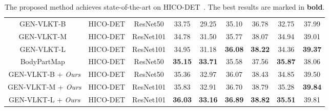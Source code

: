 \documentclass[10pt,twocolumn,letterpaper]{article}
\begin{document}
\begin{table*}
\begin{adjustbox}{width=0.8\linewidth}
\begin{tabular}{c | c c | c c c | c c c}
    GEN-VLKT-B~\cite{liao2022gen} & HICO-DET & ResNet50 & 33.75 & 29.25 & 35.10 & 36.78 & 32.75 & 37.99 \\
    GEN-VLKT-M~\cite{liao2022gen} & HICO-DET & ResNet101 & 34.78 & 31.50 & 35.77 & 38.07 & 34.94 & 39.01 \\
    GEN-VLKT-L~\cite{liao2022gen} & HICO-DET & ResNet101 & 34.95 & 31.18 & \textbf{36.08} & \textbf{38.22} & 34.36 & \textbf{39.37} \\
    BodyPartMap~\cite{wu2022bodypartmap} & HICO-DET & ResNet50 & \textbf{35.15} & \textbf{33.71} & 35.58 & 37.56 & \textbf{35.87} & 38.06 \\
    \midrule
    GEN-VLKT-B + \textit{Ours} & HICO-DET & ResNet50 & 35.36 & 32.97 & 36.07 & 38.43 & 34.85 & 39.50 \\
    GEN-VLKT-M + \textit{Ours} & HICO-DET & ResNet101 & 35.83 & 32.91 & 36.70 & 38.79 & 35.28 & \textbf{39.84} \\
    GEN-VLKT-L + \textit{Ours} & HICO-DET & ResNet101 & \textbf{36.03} & \textbf{33.16} & \textbf{36.89} & \textbf{38.82} & \textbf{35.51} & 39.81 \\
    \bottomrule
  \end{tabular}
  \end{adjustbox}
  \caption{
  The proposed method achieves state-of-the-art on HICO-DET~\cite{chao2018learning}. The best results are marked in \textbf{bold}.
  }
  \vspace{-8pt}
  \label{tab:exp-sota-hicodet}
\end{table*}
\end{document}
